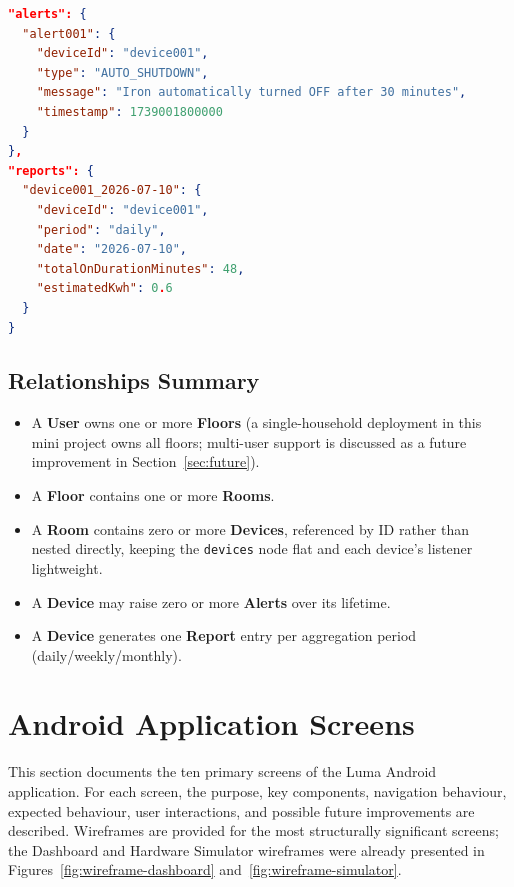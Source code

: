 \documentclass[11pt,a4paper]{article}
\begin{document}
\begin{lstlisting}[language=json,caption={Example JSON structure for an alert and a report entry.},label={lst:json-alerts}]
"alerts": {
  "alert001": {
    "deviceId": "device001",
    "type": "AUTO_SHUTDOWN",
    "message": "Iron automatically turned OFF after 30 minutes",
    "timestamp": 1739001800000
  }
},
"reports": {
  "device001_2026-07-10": {
    "deviceId": "device001",
    "period": "daily",
    "date": "2026-07-10",
    "totalOnDurationMinutes": 48,
    "estimatedKwh": 0.6
  }
}
\end{lstlisting}

\subsection{Relationships Summary}
\begin{itemize}
    \item A \textbf{User} owns one or more \textbf{Floors} (a single-household deployment in this mini project owns all floors; multi-user support is discussed as a future improvement in Section~\ref{sec:future}).
    \item A \textbf{Floor} contains one or more \textbf{Rooms}.
    \item A \textbf{Room} contains zero or more \textbf{Devices}, referenced by ID rather than nested directly, keeping the \texttt{devices} node flat and each device's listener lightweight.
    \item A \textbf{Device} may raise zero or more \textbf{Alerts} over its lifetime.
    \item A \textbf{Device} generates one \textbf{Report} entry per aggregation period (daily/weekly/monthly).
\end{itemize}

\section{Android Application Screens}
\label{sec:screens}

This section documents the ten primary screens of the Luma Android application. For each screen, the purpose, key components, navigation behaviour, expected behaviour, user interactions, and possible future improvements are described. Wireframes are provided for the most structurally significant screens; the Dashboard and Hardware Simulator wireframes were already presented in Figures~\ref{fig:wireframe-dashboard} and~\ref{fig:wireframe-simulator}.
\end{document}
